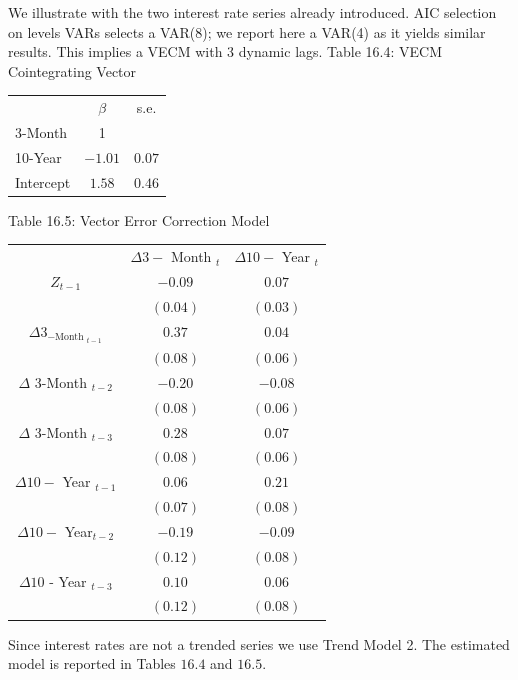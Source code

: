 \documentclass[10pt]{article}
\begin{document}
We illustrate with the two interest rate series already introduced. AIC selection on levels VARs selects a VAR(8); we report here a VAR(4) as it yields similar results. This implies a VECM with 3 dynamic lags. Table 16.4: VECM Cointegrating Vector

\begin{tabular}{lcc}
\hline\hline
 & $\beta$ & s.e. \\
\cline { 2 - 3 }
3-Month & 1 &  \\
10-Year & $-1.01$ & $0.07$ \\
Intercept & $1.58$ & $0.46$ \\
\hline
\end{tabular}

Table 16.5: Vector Error Correction Model

\begin{tabular}{ccc}
\hline\hline
 & $\Delta 3-$ Month $_{t}$ & $\Delta 10-$ Year $_{t}$ \\
\cline { 2 - 3 }
$Z_{t-1}$ & $-0.09$ & $0.07$ \\
 & $(0.04)$ & $(0.03)$ \\
$\Delta 3_{-\text {Month }_{t-1}}$ & $0.37$ & $0.04$ \\
 & $(0.08)$ & $(0.06)$ \\
$\Delta$ 3-Month $_{t-2}$ & $-0.20$ & $-0.08$ \\
 & $(0.08)$ & $(0.06)$ \\
$\Delta$ 3-Month $_{t-3}$ & $0.28$ & $0.07$ \\
 & $(0.08)$ & $(0.06)$ \\
$\Delta 10-$ Year $_{t-1}$ & $0.06$ & $0.21$ \\
 & $(0.07)$ & $(0.08)$ \\
$\Delta 10-$ Year$_{t-2}$ & $-0.19$ & $-0.09$ \\
 & $(0.12)$ & $(0.08)$ \\
$\Delta 10$ - Year $_{t-3}$ & $0.10$ & $0.06$ \\
 & $(0.12)$ & $(0.08)$ \\
\hline
\end{tabular}

Since interest rates are not a trended series we use Trend Model 2. The estimated model is reported in Tables $16.4$ and $16.5$.
\end{document}
